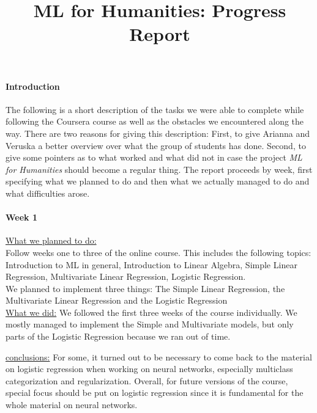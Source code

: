\documentclass[•]{article}
\title{ML for Humanities: Progress Report}
\begin{document}
\maketitle
\paragraph{Introduction} The following is a short description of the tasks we were able to complete while following the Coursera course as well as the obstacles we encountered along the way. There are two reasons for giving this description: First, to give Arianna and Veruska a better overview over what the group of students has done. Second, to give some pointers as to what worked and what did not in case the project \emph{ML for Humanities} should become a regular thing. The report proceeds by week, first specifying what we planned to do and then what we actually managed to do and what difficulties arose.
\paragraph{Week 1} \underline{What we planned to do:}\\
Follow weeks one to three of the online course. This includes the following topics: Introduction to ML in general, Introduction to Linear Algebra, Simple Linear Regression, Multivariate Linear Regression, Logistic Regression.\\
We planned to implement three things: The Simple Linear Regression, the Multivariate Linear Regression and the Logistic Regression\\
\underline{What we did:} We followed the first three weeks of the course individually. We mostly managed to implement the Simple and Multivariate models, but only parts of the Logistic Regression because we ran out of time.

\underline{conclusions:} For some, it turned out to be necessary to come back to the material on logistic regression when working on neural networks, especially multiclass categorization and regularization. Overall, for future versions of the course, special focus should be put on logistic regression since it is fundamental for the whole material on neural networks.
\end{document}
